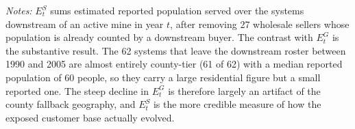\begin{table}[ht]
\begin{minipage}{\textwidth}
\vspace{0.5em}
\textit{Notes:} $E^{S}_t$ sums estimated reported population served over the systems downstream of an active mine in year $t$, after removing 27 wholesale sellers whose population is already counted by a downstream buyer. The contrast with $E^{G}_t$ is the substantive result. The 62 systems that leave the downstream roster between 1990 and 2005 are almost entirely county-tier (61 of 62) with a median reported population of 60 people, so they carry a large residential figure but a small reported one. The steep decline in $E^{G}_t$ is therefore largely an artifact of the county fallback geography, and $E^{S}_t$ is the more credible measure of how the exposed customer base actually evolved.
\end{minipage}
\end{table}
